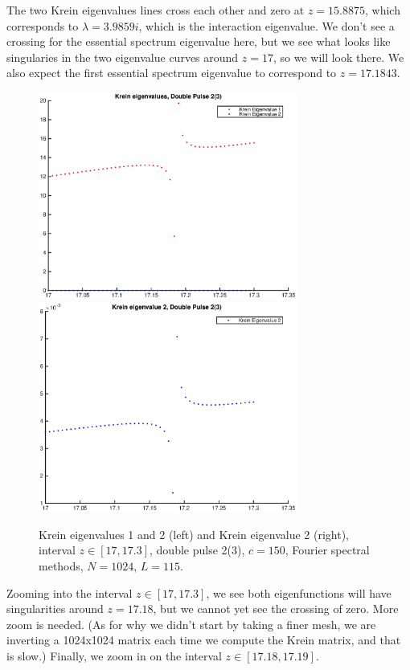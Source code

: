 \documentclass[12pt]{article}
\begin{document}
The two Krein eigenvalues lines cross each other and zero at $z = 15.8875$, which corresponds to $\lambda = 3.9859i$, which is the interaction eigenvalue. We don't see a crossing for the essential spectrum eigenvalue here, but we see what looks like singularies in the two eigenvalue curves around $z = 17$, so we will look there. We also expect the first essential spectrum eigenvalue to correspond to $z = 17.1843$.

\begin{figure}[H]
	\includegraphics[width=8.5cm]{1500F_dp2_115_kreinzoom1.eps}
	\includegraphics[width=8.5cm]{1500F_dp2_115_kreinzoom2}
	\caption{Krein eigenvalues 1 and 2 (left) and Krein eigenvalue 2 (right), interval $z \in [17, 17.3]$, double pulse 2(3), $c = 150$, Fourier spectral methods, $N = 1024$, $L = 115$. }
\end{figure}

Zooming into the interval $z \in [17, 17.3]$, we see both eigenfunctions will have singularities around $z = 17.18$, but we cannot yet see the crossing of zero. More zoom is needed. (As for why we didn't start by taking a finer mesh, we are inverting a 1024x1024 matrix each time we compute the Krein matrix, and that is slow.) Finally, we zoom in on the interval $z \in [17.18, 17.19]$.
\end{document}
